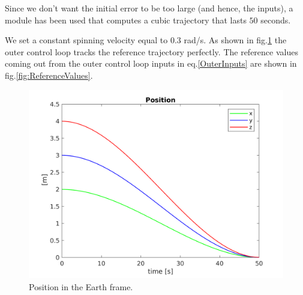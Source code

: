 \documentclass[11pt,a4paper]{scrartcl}
\begin{document}
Since we don't want the initial error to be too large (and hence, the inputs), a module has been used that computes a cubic trajectory that lasts $ 50 $ seconds.

We set a constant spinning velocity equal to $ 0.3 $ rad/s. As shown in fig.\ref{fig:outercontrolpos} the outer control loop tracks the reference trajectory perfectly. The reference values coming out from the outer control loop inputs in eq.\eqref{OuterInputs} are shown in fig.\ref{fig:ReferenceValues}.

\begin{figure}[H]
		\centering
		\includegraphics[width=0.6\linewidth]{Images/PositionOuter.png}
		\caption{Position in the Earth frame.}
		\label{fig:outercontrolpos}	
\end{figure} 
\end{document}
